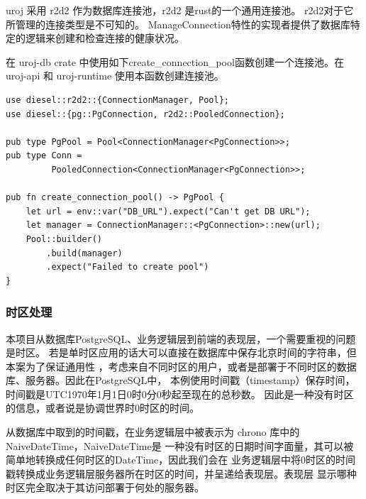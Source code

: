 uroj 采用 r2d2 作为数据库连接池，r2d2 是rust的一个通用连接池。
r2d2对于它所管理的连接类型是不可知的。
ManageConnection特性的实现者提供了数据库特定的逻辑来创建和检查连接的健康状况。

在 uroj-db crate 中使用如下create\_connection\_pool函数创建一个连接池。在
uroj-api 和 uroj-runtime 使用本函数创建连接池。
\begin{lstlisting}
use diesel::r2d2::{ConnectionManager, Pool};
use diesel::{pg::PgConnection, r2d2::PooledConnection};

pub type PgPool = Pool<ConnectionManager<PgConnection>>;
pub type Conn =
         PooledConnection<ConnectionManager<PgConnection>>;

pub fn create_connection_pool() -> PgPool {
    let url = env::var("DB_URL").expect("Can't get DB URL");
    let manager = ConnectionManager::<PgConnection>::new(url);
    Pool::builder()
        .build(manager)
        .expect("Failed to create pool")
}
\end{lstlisting}

\subsubsection{时区处理}
本项目从数据库PostgreSQL、业务逻辑层到前端的表现层，一个需要重视的问题是时区。
若是单时区应用的话大可以直接在数据库中保存北京时间的字符串，但本案为了保证通用性
，考虑来自不同时区的用户，或者是部署于不同时区的数据库、服务器。因此在PostgreSQL中，
本例使用时间戳（timestamp）保存时间，时间戳是UTC1970年1月1日0时0分0秒起至现在的总秒数。
因此是一种没有时区的信息，或者说是协调世界时0时区的时间。

从数据库中取到的时间戳，在业务逻辑层中被表示为 chrono 库中的 NaiveDateTime，NaiveDateTime是
一种没有时区的日期时间字面量，其可以被简单地转换成任何时区的DateTime，因此我们会在
业务逻辑层中将0时区的时间戳转换成业务逻辑层服务器所在时区的时间，并呈递给表现层。表现层
显示哪种时区完全取决于其访问部署于何处的服务器。
